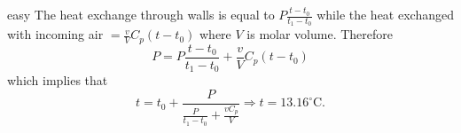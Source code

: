 \begin{solution}{easy}
The heat exchange through walls is equal to $P\frac{t -t_0}{t_1-t_0}$ while the heat exchanged with incoming air $= \frac{v}{V} C_p(t-t_0)$ where $V$ is molar volume. Therefore 
\[P = P\frac {t -t_0}{t_1-t_0}+ \frac{v}{V} C_p(t-t_0)\]
which implies that
\[t = t_0 + \frac{P}{\frac{P}{t_1-t_0}+ \frac{vC_p}{V}} \Rightarrow t = 13.16^{\circ}\text{C}.\]
\end{solution}